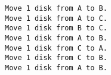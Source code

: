 \begin{EXRtwo}
\begin{jjjlisting}
\begin{lstlisting}
Move 1 disk from A to B.
Move 1 disk from A to C.
Move 1 disk from B to C.
Move 1 disk from A to B.
Move 1 disk from C to A.
Move 1 disk from C to B.
Move 1 disk from A to B.
\end{lstlisting}
\end{jjjlisting}

\end{EXRtwo}
%
